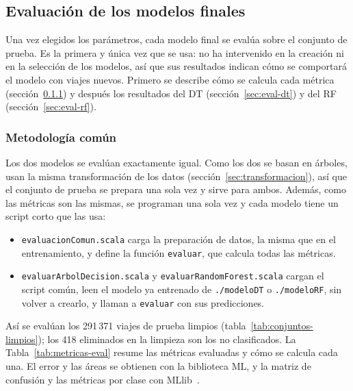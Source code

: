 \documentclass[12pt,a4paper]{article}
\begin{document}
\subsection{Evaluación de los modelos finales}
\label{sec:evaluacion}

Una vez elegidos los parámetros, cada modelo final se evalúa sobre el
conjunto de prueba. Es la primera y única vez que se usa: no ha intervenido
en la creación ni en la selección de los modelos, así que sus
resultados indican cómo se comportará el modelo con viajes nuevos. Primero
se describe cómo se calcula cada métrica (sección~\ref{sec:eval-metodologia})
y después los resultados del \ac{DT} (sección~\ref{sec:eval-dt}) y del
\ac{RF} (sección~\ref{sec:eval-rf}).


\subsubsection{Metodología común}
\label{sec:eval-metodologia}

Los dos modelos se evalúan exactamente igual. Como los dos se basan en
árboles, usan la misma transformación de los datos
(sección~\ref{sec:transformacion}), así que el conjunto de prueba se
prepara una sola vez y sirve para ambos. Además, como las métricas son las
mismas, se programan una sola vez y cada modelo tiene un script corto que
las usa:

\begin{itemize}
    \item \texttt{evaluacionComun.scala} carga la preparación de datos, la
    misma que en el entrenamiento, y define la función \texttt{evaluar},
    que calcula todas las métricas.
    \item \texttt{evaluarArbolDecision.scala} y
    \texttt{evaluarRandomForest.scala} cargan el script común, leen el
    modelo ya entrenado de \texttt{./modeloDT} o \texttt{./modeloRF}, sin
    volver a crearlo, y llaman a \texttt{evaluar} con sus predicciones.
\end{itemize}

Así se evalúan los 291\,371 viajes de prueba limpios
(tabla~\ref{tab:conjuntos-limpios}); los 418 eliminados en la limpieza son
los no clasificados. La Tabla~\ref{tab:metricas-eval} resume las métricas
evaluadas y cómo se calcula cada una. El error y las áreas se obtienen con
la biblioteca ML, y la matriz de confusión y las métricas por clase con
MLlib~\cite{spark_metricas}.
\end{document}
